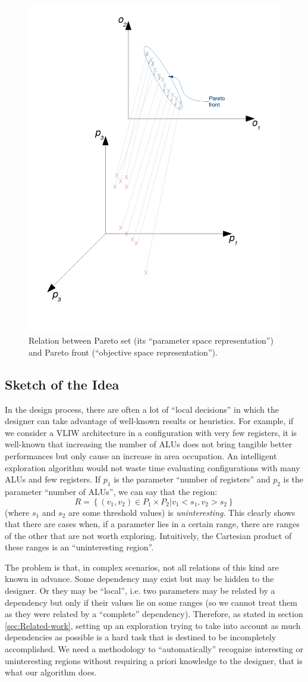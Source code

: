 \begin{figure}[h]
\label{fig:psos}
\includegraphics[width=0.5\columnwidth]{img/Pareto_set_and_front}
\caption{Relation between Pareto set (its ``parameter space representation'')
and Pareto front (``objective space representation'').}
\end{figure}

\subsection{Sketch of the Idea}

In the design process, there are often a lot of ``local decisions''
in which the designer can take advantage of well-known results or
heuristics. For example, if we consider a VLIW architecture in a configuration with very few registers, it is well-known that increasing the number of ALUs does not bring tangible better performances
but only cause an increase in area occupation. An intelligent exploration
algorithm would not waste time evaluating configurations with many
ALUs and few registers. If $p_{1}$ is the parameter ``number of
registers'' and $p_{2}$ is the parameter ``number of ALUs'', we
can say that the region:
\[
R=\left\{ \left.\left(v_{1},v_{2}\right)\in P_{1}\times P_{2}\right|v_{1}<s_{1},v_{2}>s_{2}\right\} 
\]
 (where $s_{1}$ and $s_{2}$ are some threshold values) is \emph{uninteresting}. This clearly shows that there are cases when, if a parameter lies in
a certain range, there are ranges of the other that are not worth exploring. Intuitively, the Cartesian product of these ranges is an ``uninteresting
 region''.

The problem is that, in complex scenarios, not all relations of this
kind are known in advance. Some dependency may exist but may be hidden
to the designer. Or they may be ``local'', i.e. two
parameters may be related by a dependency but only if their values
lie on some ranges (so we cannot treat them as they were related by
a ``complete'' dependency). 
Therefore, as stated in section \ref{sec:Related-work},
setting up an exploration trying to take into account as much dependencies
as possible is a hard task that is destined to be incompletely
accomplished. We need a methodology to ``automatically'' recognize
interesting or uninteresting regions without requiring a priori knowledge
to the designer, that is what our algorithm does.

